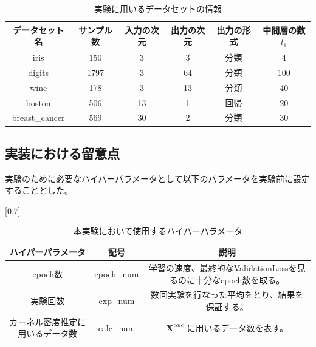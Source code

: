 \begin{table}[htbp]
    \begin{center}
        \caption{実験に用いるデータセットの情報}
        \label{dataset_name}
        \vspace{2mm} 
        \begin{tabular}{ |c|c|c|c|c|c| }
        データセット名 & サンプル数 & 入力の次元 & 出力の次元 & 出力の形式 & 中間層の数 $ {l_1} $ \\
        \hline
        iris           & 150    & 3         & 3        & 分類      & 4 \\
        digits         & 1797   & 3         & 64       & 分類      & 100 \\
        wine           & 178    & 3         & 13       & 分類      & 40 \\
        boston         & 506    & 13        & 1        & 回帰      & 20 \\
        breast\_cancer & 569    & 30        & 2        & 分類      & 30 \\
        \end{tabular}
    \end{center}
\end{table}


\subsection{実装における留意点}
実験のために必要なハイパーパラメータとして以下のパラメータを実験前に設定することとした。

\begin{table}[htbp]
    \begin{center}
        \caption{本実験において使用するハイパーパラメータ}
        \vspace{2mm} 
        \scalebox{0.7}[0.7]{
            \begin{tabular}{||c | c |c||}
            ハイパーパラメータ & 記号 & 説明 \\
            \hline
            epoch数                           & epoch\_num      & 学習の速度、最終的なValidationLossを見るのに十分なepoch数を取る。  \\
            実験回数                           & exp\_num     & 数回実験を行なった平均をとり、結果を保証する。 \\
            カーネル密度推定に用いるデータ数        & calc\_num           & $ \mathbf{X}^{calc} $ に用いるデータ数を表す。  \\
            \end{tabular}
        }
    \end{center}
\end{table}

